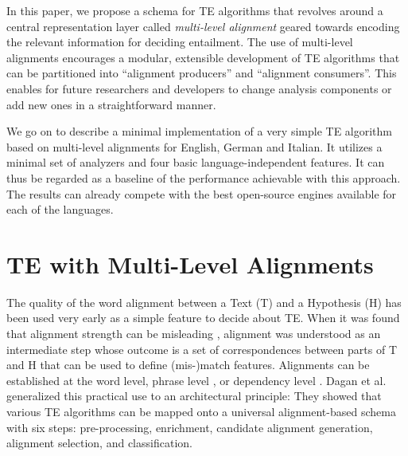 \documentclass[11pt,a4paper]{article}
\begin{document}


In this paper, we propose a schema for TE algorithms that revolves
around a central representation layer called {\em multi-level
  alignment} geared towards encoding the relevant information for
deciding entailment. The use of multi-level alignments encourages a
modular, extensible development of TE algorithms that can be
partitioned into ``alignment producers'' and ``alignment
consumers''. This enables for future researchers and developers to
change analysis components or add new ones in a straightforward
manner.

We go on to describe a minimal implementation of a very simple TE
algorithm based on multi-level alignments for English, German and
Italian. It utilizes a minimal set of analyzers and four basic
language-independent features. It can thus be regarded as a baseline
of the performance achievable with this approach.  The results can
already compete with the best open-source engines available for each
of the languages.

\section{TE with Multi-Level Alignments}

The quality of the word alignment between a Text (T) and a Hypothesis
(H) has been used very early as a simple feature to decide about
TE. When it was found that alignment strength  can be
misleading \cite{maccartney-EtAl:2006:HLT-NAACL06-Main}, alignment was
understood as an intermediate step whose outcome is a set of
correspondences between parts of T and H that can be used to define
(mis-)match features. Alignments can be established at the word level,
phrase level \cite{MacCartney:EMNLP08}, or dependency level
\cite{dinu-wang:2009:EACL}. Dagan et al. 
generalized this practical use to an architectural principle: They
showed that various TE algorithms can be mapped onto a universal
alignment-based schema with six steps: pre-processing, enrichment,
candidate alignment generation, alignment selection, and
classification.
\end{document}
